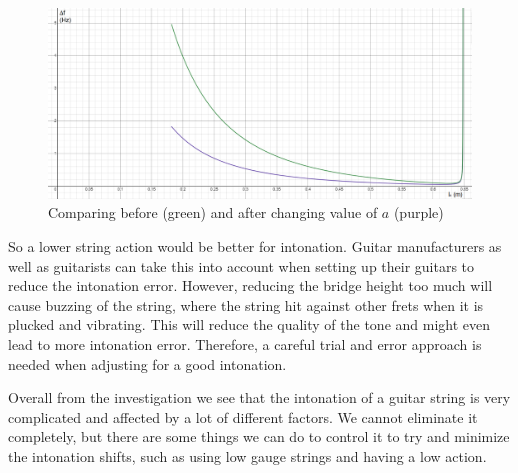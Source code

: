 \begin{figure}[!h]
    \includegraphics[width = \textwidth]{./ee/compare_graph_a.png}
    \caption{Comparing before (green) and after changing value of $a$ (purple)} \label{fig13}
\end{figure}
So a lower string action would be better for intonation. Guitar manufacturers as well as guitarists can take this into account when setting up their guitars to reduce the intonation error. However, reducing the bridge height too much will cause buzzing of the string, where the string hit against other frets when it is plucked and vibrating. This will reduce the quality of the tone and might even lead to more intonation error. Therefore, a careful trial and error approach is needed when adjusting for a good intonation. \par
Overall from the investigation we see that the intonation of a guitar string is very complicated and affected by a lot of different factors. We cannot eliminate it completely, but there are some things we can do to control it to try and minimize the intonation shifts, such as using low gauge strings and having a low action.